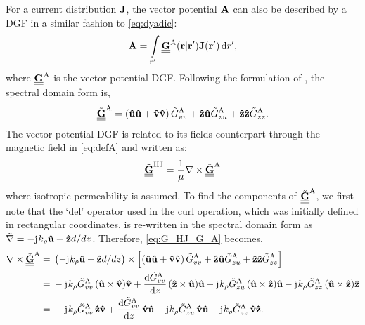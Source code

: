 \documentclass[12pt]{article}
\begin{document}
For a current distribution $\mathbf{J}$, the vector potential $\mathbf{A}$ can also be described by a DGF in a similar fashion to \eqref{eq:dyadic}:
%
\begin{equation}
\mathbf{A} = \int\limits_{r'} \underline{\underline{\mathbf{G}}}^\mathrm{A}(\mathbf{r} | \mathbf{r'}) \mathbf{J}(\mathbf{r'}) \mathop{}\!\mathrm{d}{r'},
\label{eq:G^A}
\end{equation}
%
where $\underline{\underline{\mathbf{G}}}^\mathrm{A}$ is the vector potential DGF. Following the formulation of \cite{Michalski1997}, the spectral domain form is,
%
\begin{equation}
  \underline{\underline{\tilde{\mathbf{G}}}}^\mathrm{A} = \left( \mathbf{\hat u} \mathbf{\hat u} + \mathbf{\hat v} \mathbf{\hat v} \right) \tilde{G}^\mathrm{A}_{vv} + \mathbf{\hat z} \mathbf{\hat u} \tilde{G}^\mathrm{A}_{zu} + \mathbf{\hat z} \mathbf{\hat z} \tilde{G}^\mathrm{A}_{zz}.
  \label{eq:G^A_general_form}
\end{equation}
%
The vector potential DGF is related to its fields counterpart through the magnetic field in \eqref{eq:defA} and written as:
%
\begin{equation}
  \underline{\underline{\tilde{\mathbf{G}}}}^\mathrm{HJ} = \frac{1}{\mu} \nabla \times \underline{\underline{\tilde{\mathbf{G}}}}^\mathrm{A}
  \label{eq:G_HJ_G_A}
\end{equation}
%
where isotropic permeability is assumed. To find the components of $\underline{\underline{\tilde{\mathbf{G}}}}^\mathrm{A}$, we first note that the `del' operator used in the curl operation, which was initially defined in rectangular coordinates, is re-written in the spectral domain form as $\tilde{\nabla} = -\mathrm{j}\mkern1mu k_{\rho} \mathbf{\hat u} + \mathbf{\hat z} d/{dz}$. Therefore, \eqref{eq:G_HJ_G_A} becomes,
%
\begin{equation}
  \begin{split}
    \nabla \times \underline{\underline{\tilde{\mathbf{G}}}}^\mathrm{A} ={}&  \left(-\mathrm{j}\mkern1mu k_{\rho} \mathbf{\hat u} + \mathbf{\hat z} d/{dz} \right) \times \left[ \left( \mathbf{\hat u} \mathbf{\hat u} + \mathbf{\hat v} \mathbf{\hat v} \right) \tilde{G}^\mathrm{A}_{vv} + \mathbf{\hat z} \mathbf{\hat u} \tilde{G}^\mathrm{A}_{zu} + \mathbf{\hat z} \mathbf{\hat z} \tilde{G}^\mathrm{A}_{zz} \right] \\
    ={}& -\mathrm{j}\mkern1mu k_{\rho} \tilde{G}^\mathrm{A}_{vv} \,(\mathbf{\hat u} \times \mathbf{\hat v})\mathbf{\hat v} + \dv{\tilde{G}^\mathrm{A}_{vv}}{z} \,(\mathbf{\hat z} \times \mathbf{\hat u})\mathbf{\hat u} - \mathrm{j}\mkern1mu k_{\rho} \tilde{G}^\mathrm{A}_{zu} \,(\mathbf{\hat u} \times \mathbf{\hat z})\mathbf{\hat u} - \mathrm{j}\mkern1mu k_{\rho} \tilde{G}^\mathrm{A}_{zz} \,(\mathbf{\hat u} \times \mathbf{\hat z})\mathbf{\hat z} \\
    ={}& -\mathrm{j}\mkern1mu k_{\rho} \tilde{G}^\mathrm{A}_{vv} \,\mathbf{\hat z}\mathbf{\hat v} + \dv{\tilde{G}^\mathrm{A}_{vv}}{z} \,\mathbf{\hat v}\mathbf{\hat u} + \mathrm{j}\mkern1mu k_{\rho} \tilde{G}^\mathrm{A}_{zu}\, \mathbf{\hat v}\mathbf{\hat u} + \mathrm{j}\mkern1mu k_{\rho} \tilde{G}^\mathrm{A}_{zz}\, \mathbf{\hat v}\mathbf{\hat z}.
  \end{split}
  \label{eq:curl_of_GA}
\end{equation}
\end{document}
